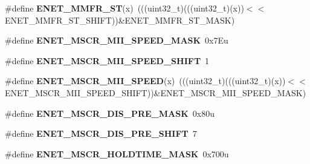 \begin{DoxyCompactItemize}
\item 
\#define {\bfseries E\+N\+E\+T\+\_\+\+M\+M\+F\+R\+\_\+\+ST}(x)~(((uint32\+\_\+t)(((uint32\+\_\+t)(x))$<$$<$E\+N\+E\+T\+\_\+\+M\+M\+F\+R\+\_\+\+S\+T\+\_\+\+S\+H\+I\+FT))\&E\+N\+E\+T\+\_\+\+M\+M\+F\+R\+\_\+\+S\+T\+\_\+\+M\+A\+SK)\hypertarget{group__ENET__Register__Masks_ga674fe7443651f825f3b58144847a7f91}{}\label{group__ENET__Register__Masks_ga674fe7443651f825f3b58144847a7f91}

\item 
\#define {\bfseries E\+N\+E\+T\+\_\+\+M\+S\+C\+R\+\_\+\+M\+I\+I\+\_\+\+S\+P\+E\+E\+D\+\_\+\+M\+A\+SK}~0x7\+Eu\hypertarget{group__ENET__Register__Masks_ga1cb1a68c64288642ffaba2a5866990cc}{}\label{group__ENET__Register__Masks_ga1cb1a68c64288642ffaba2a5866990cc}

\item 
\#define {\bfseries E\+N\+E\+T\+\_\+\+M\+S\+C\+R\+\_\+\+M\+I\+I\+\_\+\+S\+P\+E\+E\+D\+\_\+\+S\+H\+I\+FT}~1\hypertarget{group__ENET__Register__Masks_ga82d16561cec7a3078e68de4d7c9c72f2}{}\label{group__ENET__Register__Masks_ga82d16561cec7a3078e68de4d7c9c72f2}

\item 
\#define {\bfseries E\+N\+E\+T\+\_\+\+M\+S\+C\+R\+\_\+\+M\+I\+I\+\_\+\+S\+P\+E\+ED}(x)~(((uint32\+\_\+t)(((uint32\+\_\+t)(x))$<$$<$E\+N\+E\+T\+\_\+\+M\+S\+C\+R\+\_\+\+M\+I\+I\+\_\+\+S\+P\+E\+E\+D\+\_\+\+S\+H\+I\+FT))\&E\+N\+E\+T\+\_\+\+M\+S\+C\+R\+\_\+\+M\+I\+I\+\_\+\+S\+P\+E\+E\+D\+\_\+\+M\+A\+SK)\hypertarget{group__ENET__Register__Masks_ga99659f5579cf09698781ff2928e82e2e}{}\label{group__ENET__Register__Masks_ga99659f5579cf09698781ff2928e82e2e}

\item 
\#define {\bfseries E\+N\+E\+T\+\_\+\+M\+S\+C\+R\+\_\+\+D\+I\+S\+\_\+\+P\+R\+E\+\_\+\+M\+A\+SK}~0x80u\hypertarget{group__ENET__Register__Masks_ga9387f22e8849499571e0755718ff4d73}{}\label{group__ENET__Register__Masks_ga9387f22e8849499571e0755718ff4d73}

\item 
\#define {\bfseries E\+N\+E\+T\+\_\+\+M\+S\+C\+R\+\_\+\+D\+I\+S\+\_\+\+P\+R\+E\+\_\+\+S\+H\+I\+FT}~7\hypertarget{group__ENET__Register__Masks_gaa4bd1e56f919591ae627d376271da560}{}\label{group__ENET__Register__Masks_gaa4bd1e56f919591ae627d376271da560}

\item 
\#define {\bfseries E\+N\+E\+T\+\_\+\+M\+S\+C\+R\+\_\+\+H\+O\+L\+D\+T\+I\+M\+E\+\_\+\+M\+A\+SK}~0x700u\hypertarget{group__ENET__Register__Masks_gaf0be3bf4ebe6e922406c96f80faf3481}{}\label{group__ENET__Register__Masks_gaf0be3bf4ebe6e922406c96f80faf3481}


\end{DoxyCompactItemize}
